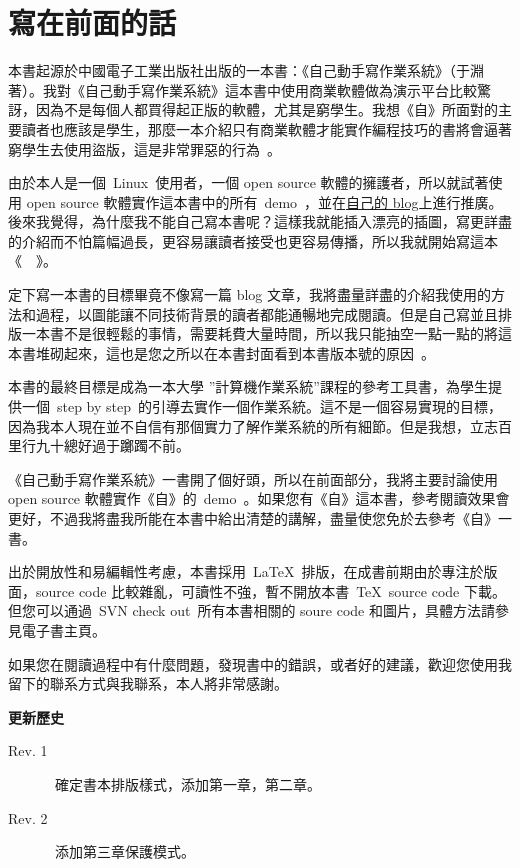 \chapter{寫在前面的話} \label{fore}


\begin{kaitext}

本書起源於中國電子工業出版社出版的一本書：《自己動手寫作業系統》（于淵著）。我對《自己動手寫作業系統》這本書中使用商業軟體做為演示平台比較驚訝，因為不是每個人都買得起正版的軟體，尤其是窮學生。我想《自》所面對的主要讀者也應該是學生，那麼一本介紹只有商業軟體才能實作編程技巧的書將會逼著窮學生去使用盜版，這是非常罪惡的行為~\frownie。

由於本人是一個~Linux~使用者，一個 open source 軟體的擁護者，所以就試著使用
open source 軟體實作這本書中的所有~demo~，並在\href{http://blog.solrex.cn}
{自己的 blog}上進行推廣。後來我覺得，為什麼我不能自己寫本書呢？這樣我就能插入漂亮的插圖，寫更詳盡的介紹而不怕篇幅過長，更容易讓讀者接受也更容易傳播，所以我就開始寫這本《~\BookName~》。

定下寫一本書的目標畢竟不像寫一篇 blog 文章，我將盡量詳盡的介紹我使用的方法和過程，以圖能讓不同技術背景的讀者都能通暢地完成閱讀。但是自己寫並且排版一本書不是很輕鬆的事情，需要耗費大量時間，所以我只能抽空一點一點的將這本書堆砌起來，這也是您之所以在本書封面看到本書版本號的原因~\smiley。

本書的最終目標是成為一本大學 ''計算機作業系統''課程的參考工具書，為學生提供一個~step by step~的引導去實作一個作業系統。這不是一個容易實現的目標，因為我本人現在並不自信有那個實力了解作業系統的所有細節。但是我想，立志百里行九十總好過于躑躅不前。

《自己動手寫作業系統》一書開了個好頭，所以在前面部分，我將主要討論使用 open source 軟體實作《自》的~demo~。如果您有《自》這本書，參考閱讀效果會更好，不過我將盡我所能在本書中給出清楚的講解，盡量使您免於去參考《自》一書。

出於開放性和易編輯性考慮，本書採用~\LaTeX~排版，在成書前期由於專注於版面，source code 比較雜亂，可讀性不強，暫不開放本書~\TeX~source code 下載。但您可以通過~SVN check out~所有本書相關的 soure code 和圖片，具體方法請參見電子書主頁。

如果您在閱讀過程中有什麼問題，發現書中的錯誤，或者好的建議，歡迎您使用我留下的聯系方式與我聯系，本人將非常感謝。
\vskip 1cm
\noindent
{}
\end{kaitext}

\begin{lined}{\textwidth}
\textbf{更新歷史}
\small
\begin{description}
    \item[Rev. 1]~確定書本排版樣式，添加第一章，第二章。
    \item[Rev. 2]~添加第三章保護模式。
\end{description}
\vspace{2ex}
\end{lined}

